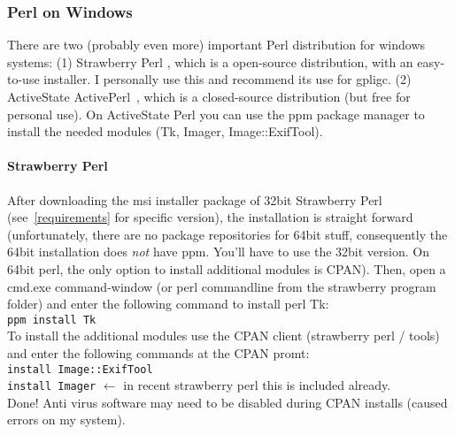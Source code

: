 \subsubsection{Perl on Windows}
\label{perl}
There are two (probably even more) important Perl distribution for windows systems:
(1) Strawberry Perl \cite{strawberryperl}, which is a open-source distribution, with an easy-to-use installer.
I personally use this and recommend its use for gpligc.
(2) ActiveState ActivePerl~\cite{activeperl}, which is a closed-source distribution (but free for personal use).
On ActiveState Perl you can use the ppm package manager to install the needed modules (Tk, Imager, Image::ExifTool).

\paragraph{Strawberry Perl}
After downloading the msi installer package of 32bit Strawberry Perl (see~\ref{requirements} for specific version),
the installation is straight forward (unfortunately, there are no package repositories for 64bit stuff, consequently the 64bit installation does \emph{not} have ppm. You'll have to use the 32bit version. On 64bit perl, the only option to install additional modules is CPAN).
Then, open a cmd.exe command-window (or perl commandline from the strawberry program folder) and enter the following
command to install perl Tk:\\
\texttt{ppm install Tk}\\
To install the additional modules use the CPAN client (strawberry perl / tools) and enter the following commands
at the CPAN promt:\\
\texttt{install Image::ExifTool}\\
\texttt{install Imager}  $\leftarrow$ in recent strawberry perl this is included already.\\
Done!
Anti virus software may need to be disabled during CPAN installs (caused errors on my system).



